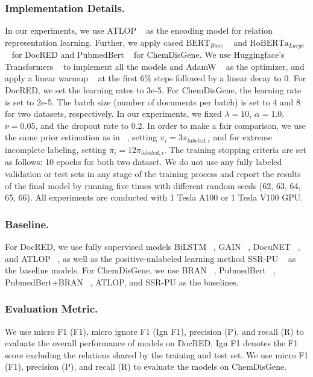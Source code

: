\documentclass[letterpaper]{article}
\begin{document}
\subsubsection{Implementation Details.}
In our experiments, we use ATLOP ~\cite{DBLP:conf/aaai/Zhou0M021} as the encoding model for relation representation learning. Further, we apply cased $\mathrm{BERT}_{Base}$ ~\cite{DBLP:conf/naacl/DevlinCLT19} and $\mathrm{RoBERTa}_{Large}$ ~\cite{DBLP:journals/corr/abs-1907-11692} for DocRED and $\mathrm{PubmedBert}$ ~\cite{DBLP:journals/health/GuTCLULNGP22} for ChemDisGene. We use Huggingface's Transformers ~\cite{DBLP:conf/emnlp/WolfDSCDMCRLFDS20} to implement all the models and AdamW ~\cite{DBLP:conf/iclr/LoshchilovH19} as the optimizer, and apply a linear warmup ~\cite{DBLP:journals/corr/GoyalDGNWKTJH17} at the first 6\% steps followed by a linear decay to 0. For DocRED, we set the learning rates to 3e-5. For ChemDisGene, the learning rate is set to 2e-5. The batch size (number of documents per batch) is set to 4 and 8 for two datasets, respectively. In our experiments, we fixed $\lambda=10$, $\alpha=1.0$, $\nu=0.05$, and the dropout rate to 0.2. In order to make a fair comparison, we use the same prior estimation as in ~\cite{DBLP:conf/emnlp/WangLHZ22}, setting $\pi_{i}=3\pi_{labeled,i}$ and for extreme incomplete labeling, setting $\pi_{i}=12\pi_{labeled,i}$. The training stopping criteria are set as follows: 10 epochs for both two dataset. We do not use any fully labeled validation or test sets in any stage of the training process and report the results of the final model by running five times with different random seeds (62, 63, 64, 65, 66). All experiments are conducted with 1 Tesla A100 or 1 Tesla V100 GPU.

\subsubsection{Baseline.}
For DocRED, we use fully supervised models BiLSTM ~\cite{DBLP:conf/acl/YaoYLHLLLHZS19}, GAIN ~\cite{DBLP:conf/emnlp/ZengXCL20}, DocuNET ~\cite{DBLP:conf/ijcai/ZhangCXDTCHSC21}, and ATLOP ~\cite{DBLP:conf/aaai/Zhou0M021}, as well as the positive-unlabeled learning method SSR-PU ~\cite{DBLP:conf/emnlp/WangLHZ22} as the baseline models. For ChemDisGene, we use BRAN ~\cite{DBLP:conf/naacl/VergaSM18}, PubmedBert ~\cite{DBLP:journals/health/GuTCLULNGP22}, PubmedBert+BRAN ~\cite{DBLP:conf/lrec/ZhangMTM22}, ATLOP, and SSR-PU as the baselines.

\subsubsection{Evaluation Metric.}
We use micro F1 (F1), micro ignore F1 (Ign F1), precision (P), and recall (R) to evaluate the overall performance of models on DocRED. Ign F1 denotes the F1 score excluding the relations shared by the training and test set. We use micro F1 (F1), precision (P), and recall (R) to evaluate the models on ChemDisGene.
\end{document}
